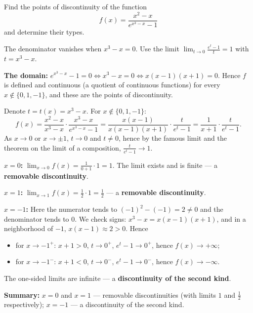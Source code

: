 
\begin{question}
Find the points of discontinuity of the function
\[ f(x)=\frac{x^2-x}{e^{x^3-x}-1} \]
and determine their types.
\end{question}

\begin{hint}
The denominator vanishes when $x^3-x=0$. Use the limit $\lim_{t\to0}\frac{e^t-1}{t}=1$ with $t=x^3-x$.
\end{hint}

\begin{solution}
\textbf{The domain:} $e^{x^3-x}-1=0\iff x^3-x=0\iff x(x-1)(x+1)=0$. Hence $f$ is defined and continuous (a quotient of continuous functions) for every $x\notin\{0,1,-1\}$, and these are the points of discontinuity.

Denote $t=t(x)=x^3-x$. For $x\notin\{0,1,-1\}$:
\[ f(x)=\frac{x^2-x}{x^3-x}\cdot\frac{x^3-x}{e^{x^3-x}-1}=\frac{x(x-1)}{x(x-1)(x+1)}\cdot\frac{t}{e^t-1}=\frac{1}{x+1}\cdot\frac{t}{e^t-1}. \]
As $x\to0$ or $x\to\pm1$, $t\to0$ and $t\neq0$, hence by the famous limit and the theorem on the limit of a composition, $\frac{t}{e^t-1}\to1$.

\textbf{$x=0$:} $\lim_{x\to0}f(x)=\frac{1}{0+1}\cdot1=1$. The limit exists and is finite — a \textbf{removable discontinuity}.

\textbf{$x=1$:} $\lim_{x\to1}f(x)=\frac{1}{2}\cdot1=\frac12$ — a \textbf{removable discontinuity}.

\textbf{$x=-1$:} Here the numerator tends to $(-1)^2-(-1)=2\neq0$ and the denominator tends to $0$. We check signs: $x^3-x=x(x-1)(x+1)$, and in a neighborhood of $-1$, $x(x-1)\approx2>0$. Hence
\begin{itemize}
  \item for $x\to-1^+$: $x+1>0$, $t\to0^+$, $e^t-1\to0^+$, hence $f(x)\to+\infty$;
  \item for $x\to-1^-$: $x+1<0$, $t\to0^-$, $e^t-1\to0^-$, hence $f(x)\to-\infty$.
\end{itemize}
The one-sided limits are infinite — a \textbf{discontinuity of the second kind}.

\textbf{Summary:} $x=0$ and $x=1$ — removable discontinuities (with limits $1$ and $\frac12$ respectively); $x=-1$ — a discontinuity of the second kind.
\end{solution}
